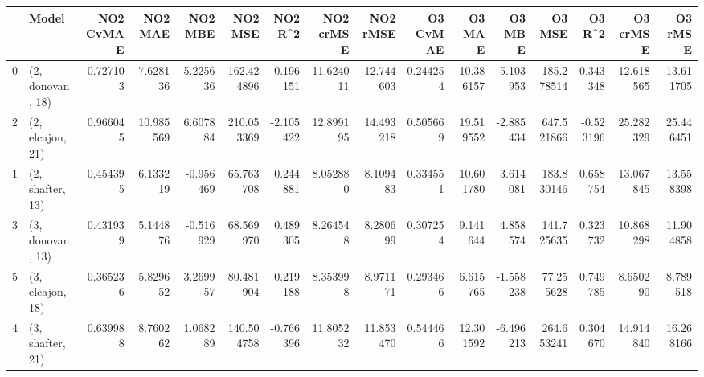 \begin{tabular}{llrrrrrrrrrrrrrr}
\toprule
{} &             Model &  NO2 CvMAE &    NO2 MAE &   NO2 MBE &     NO2 MSE &   NO2 R\textasciicircum2 &  NO2 crMSE &   NO2 rMSE &  O3 CvMAE &     O3 MAE &    O3 MBE &      O3 MSE &    O3 R\textasciicircum2 &   O3 crMSE &    O3 rMSE \\
\midrule
0 &  (2, donovan, 18) &   0.727103 &   7.628136 &  5.225636 &  162.424896 & -0.196151 &  11.624011 &  12.744603 &  0.244254 &  10.386157 &  5.103953 &  185.278514 &  0.343348 &  12.618565 &  13.611705 \\
2 &  (2, elcajon, 21) &   0.966045 &  10.985569 &  6.607884 &  210.053369 & -2.105422 &  12.899195 &  14.493218 &  0.505669 &  19.519552 & -2.885434 &  647.521866 & -0.523196 &  25.282329 &  25.446451 \\
1 &  (2, shafter, 13) &   0.454395 &   6.133219 & -0.956469 &   65.763708 &  0.244881 &   8.052880 &   8.109483 &  0.334551 &  10.601780 &  3.614081 &  183.830146 &  0.658754 &  13.067845 &  13.558398 \\
3 &  (3, donovan, 13) &   0.431939 &   5.144876 & -0.516929 &   68.569970 &  0.489305 &   8.264548 &   8.280699 &  0.307254 &   9.141644 &  4.858574 &  141.725635 &  0.323732 &  10.868298 &  11.904858 \\
5 &  (3, elcajon, 18) &   0.365236 &   5.829652 &  3.269957 &   80.481904 &  0.219188 &   8.353998 &   8.971171 &  0.293466 &   6.615765 & -1.558238 &   77.255628 &  0.749785 &   8.650290 &   8.789518 \\
4 &  (3, shafter, 21) &   0.639988 &   8.760262 &  1.068289 &  140.504758 & -0.766396 &  11.805232 &  11.853470 &  0.544466 &  12.301592 & -6.496213 &  264.653241 &  0.304670 &  14.914840 &  16.268166 \\
\bottomrule
\end{tabular}
